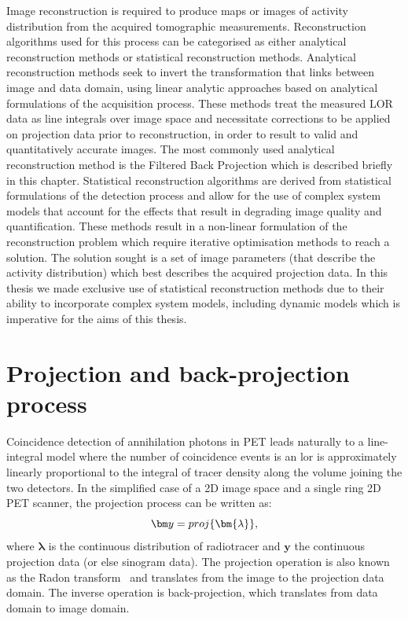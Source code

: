 Image reconstruction is required to produce maps or images of activity distribution from the acquired tomographic measurements. Reconstruction algorithms used for this process can be categorised as either analytical reconstruction methods or statistical reconstruction methods.  
Analytical reconstruction methods seek to invert the transformation that links between image and data domain, using linear analytic approaches based on analytical formulations of the acquisition process. These methods treat the measured LOR data as line integrals over image space and necessitate corrections to be applied on projection data prior to reconstruction, in order to result to valid and quantitatively accurate images. The most commonly used analytical reconstruction method is the Filtered Back Projection which is described briefly in this chapter. 
Statistical reconstruction algorithms are derived from statistical formulations of the detection process and allow for the use of complex system models that account for the effects that result in degrading image quality and quantification.  These methods result in a non-linear formulation of the reconstruction problem which require iterative optimisation methods to reach a solution. The solution sought is a set of image parameters (that describe the activity distribution) which best describes the acquired projection data. 
In this thesis we made exclusive use of statistical reconstruction methods due to their ability to incorporate complex system models, including dynamic models which is imperative for the aims of this thesis.


\section{Projection and back-projection process}
Coincidence detection of annihilation photons in PET leads naturally to a line-integral model where the number of coincidence events is an \gls{lor} is approximately linearly proportional to the integral of tracer density along the volume joining the two detectors. 
In the simplified case of a 2D image space and a single ring 2D PET scanner, the projection process can be written as:
\begin{equation}
   \bm y = proj\{\bm{\lambda}\}  \\, 
  \label{eqn:Radon}
\end{equation}
where $\bm{\lambda}$ is the continuous distribution of radiotracer and $\bm{y}$ the continuous projection data (or else sinogram data). 
The projection operation is also known as the Radon transform~\cite{radon1917} and translates from the image to the projection data domain. 
The inverse operation is back-projection, which translates from data domain to image domain.

